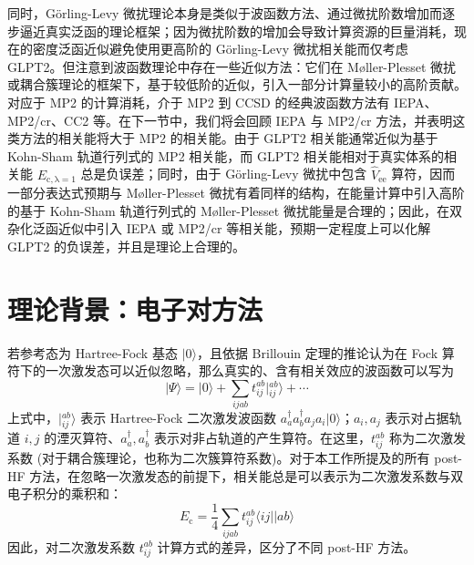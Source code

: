 同时，G\"orling-Levy 微扰理论本身是类似于波函数方法、通过微扰阶数增加而逐步逼近真实泛函的理论框架；因为微扰阶数的增加会导致计算资源的巨量消耗，现在的密度泛函近似避免使用更高阶的 G\"orling-Levy 微扰相关能而仅考虑 GLPT2。但注意到波函数理论中存在一些近似方法：它们在 M\o{}ller-Plesset 微扰或耦合簇理论的框架下，基于较低阶的近似，引入一部分计算量较小的高阶贡献。对应于 MP2 的计算消耗，介于 MP2 到 CCSD 的经典波函数方法有 IEPA\cite{Sinanoǧlu-Sinanoǧlu.ACP.1964, Nesbet-Nesbet.ACP.1965}、MP2/cr\cite{Dykstra-Davidson.IJQC.2000}、CC2\cite{Christiansen-Joergensen.CPL.1995} 等。在下一节中，我们将会回顾 IEPA 与 MP2/cr 方法，并表明这类方法的相关能将大于 MP2 的相关能。由于 GLPT2 相关能通常近似为基于 Kohn-Sham 轨道行列式的 MP2 相关能，而 GLPT2 相关能相对于真实体系的相关能 $E_\mathrm{c, \lambda=1}$ 总是负误差；同时，由于 G\"orling-Levy 微扰中包含 $\hat V_\mathrm{ee}$ 算符，因而一部分表达式预期与 M\o{}ller-Plesset 微扰有着同样的结构，在能量计算中引入高阶的基于 Kohn-Sham 轨道行列式的 M\o{}ller-Plesset 微扰能量是合理的；因此，在双杂化泛函近似中引入 IEPA 或 MP2/cr 等相关能，预期一定程度上可以化解 GLPT2 的负误差，并且是理论上合理的。

\section{理论背景：电子对方法}
\label{sec.2.iepa-theory}

若参考态为 Hartree-Fock 基态 $| 0 \rangle$，且依据 Brillouin 定理的推论认为在 Fock 算符下的一次激发态可以近似忽略，那么真实的、含有相关效应的波函数可以写为
\begin{equation}
  | \Psi \rangle = | 0 \rangle + \sum_{ijab} t_{ij}^{ab} | {}_{ij}^{ab} \rangle + \cdots
\end{equation}
上式中，$| {}_{ij}^{ab} \rangle$ 表示 Hartree-Fock 二次激发波函数 $a_a^\dagger a_b^\dagger a_j a_i | 0 \rangle$；$a_i, a_j$ 表示对占据轨道 $i, j$ 的湮灭算符、$a_a^\dagger, a_b^\dagger$ 表示对非占轨道的产生算符。在这里，$t_{ij}^{ab}$ 称为二次激发系数 (对于耦合簇理论，也称为二次簇算符系数)。对于本工作所提及的所有 post-HF 方法，在忽略一次激发态的前提下，相关能总是可以表示为二次激发系数与双电子积分的乘积和：
\begin{equation}
  E_\mathrm{c} = \frac{1}{4} \sum_{ijab} t_{ij}^{ab} \langle ij || ab \rangle
\end{equation}
因此，对二次激发系数 $t_{ij}^{ab}$ 计算方式的差异，区分了不同 post-HF 方法。

